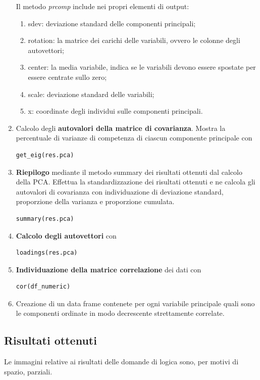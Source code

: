 \begin{enumerate}
Il metodo \textit{prcomp} include nei propri elementi di output:
 \begin{enumerate}
 \item sdev: deviazione standard delle componenti principali;
 \item rotation: la matrice dei carichi delle variabili, ovvero le colonne degli autovettori;
 \item center: la media variabile, indica se le variabili devono essere spostate per essere centrate sullo zero;
 \item scale: deviazione standard delle variabili;
 \item x: coordinate degli individui sulle componenti principali.
 \end{enumerate}
 \noindent
\item Calcolo degli \textbf{autovalori della matrice di covarianza}. Mostra la percentuale di varianze di competenza di ciascun componente principale con
\begin{verbatim}
get_eig(res.pca)
\end{verbatim}

\item \textbf{Riepilogo} mediante il metodo summary dei risultati ottenuti dal calcolo della PCA. Effettua la standardizzazione dei risultati ottenuti e ne calcola gli autovalori di covarianza con individuazione di deviazione standard, proporzione della varianza e proporzione cumulata.
\begin{verbatim}
summary(res.pca)
\end{verbatim}
\item \textbf{Calcolo degli autovettori} con
\begin{verbatim}
loadings(res.pca)
\end{verbatim}

\item \textbf{Individuazione della matrice correlazione} dei dati con
\begin{verbatim}
cor(df_numeric)
\end{verbatim}

\item Creazione di un data frame contenete per ogni variabile principale quali sono le componenti ordinate in modo decrescente strettamente correlate.
\end{enumerate}

\subsection{Risultati ottenuti}
\label{Risultati ottenuti}
Le immagini relative ai risultati delle domande di logica sono, per motivi di spazio, parziali.
